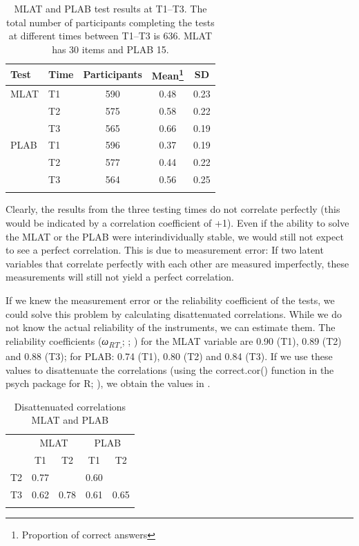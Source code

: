 \documentclass[output=paper]{langsci/langscibook}
\begin{document}
\begin{table}
\caption{\label{tab:10:1}MLAT and PLAB test results at T1--T3. The total number of participants completing the tests at different times between T1--T3 is 636. MLAT has 30 items and PLAB 15.}
\begin{tabular}{ll ccc}
\lsptoprule
{Test} & {Time} & {Participants} & {Mean\footnote{Proportion of correct answers}} & {SD}\\\midrule
{MLAT} & {T1} & {590} & {0.48} & {0.23}\\
       & {T2} & {575} & {0.58} & {0.22}\\
       & {T3} & {565} & {0.66} & {0.19}\\
{PLAB} & {T1} & {596} & {0.37} & {0.19}\\
       & {T2} & {577} & {0.44} & {0.22}\\
       & {T3} & {564} & {0.56} & {0.25}\\
\lspbottomrule
\end{tabular}
\end{table}

Clearly, the results from the three testing times do not correlate perfectly (this would be indicated by a correlation coefficient of +1). Even if the ability to solve the MLAT or the PLAB were interindividually stable, we would still not expect to see a perfect correlation. This is due to measurement error: If two latent variables that correlate perfectly with each other are measured imperfectly, these measurements will still not yield a perfect correlation. 

If we knew the measurement error or the reliability coefficient of the tests, we could solve this problem by calculating disattenuated correlations. While we do not know the actual reliability of the instruments, we can estimate them. The reliability coefficients (\textit{ω\textsubscript{RT,}}; \citealt{McNeish2018}; \citealt{Revelle2019}) for the MLAT variable are 0.90 (T1), 0.89 (T2) and 0.88 (T3); for PLAB: 0.74 (T1), 0.80 (T2) and 0.84 (T3). If we use these values to disattenuate the correlations (using the correct.cor() function in the psych package for R; \citealt{Revelle2018}), we obtain the values in .



\begin{table}
\caption{\label{tab:10:2}\label{tab:10:3}Disattenuated correlations MLAT and PLAB}
\begin{tabular}{lcc cc}
\lsptoprule
     & \multicolumn{2}{c}{MLAT} & \multicolumn{2}{c}{PLAB}\\\cmidrule(lr){2-3}\cmidrule(lr){4-5}
     & {T1} & {T2}     & {T1} & {T2}\\\midrule
{T2} & {0.77} &        & {0.60} & \\
{T3} & {0.62} & {0.78} & {0.61} & {0.65}\\
\lspbottomrule
\end{tabular}
\end{table}
\end{document}
